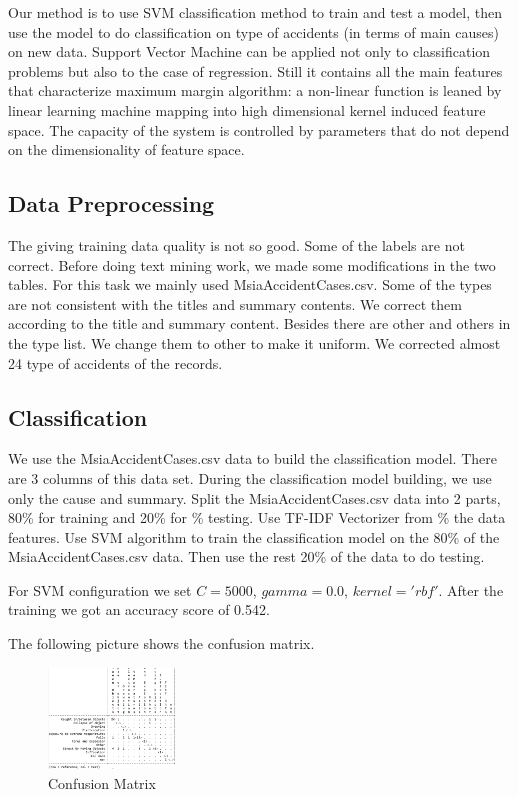 \documentclass[DIV=calc, paper=a4, fontsize=11pt, twocolumn]{scrartcl}	 %
\begin{document}
Our method is to use SVM classification method to train and
test a model, then use the model to do classification on type of
accidents (in terms of main causes) on new data. Support Vector
Machine can be applied not only to classification problems but also to
the case of regression. Still it contains all the main features that
characterize maximum margin algorithm: a non-linear function is leaned
by linear learning machine mapping into high dimensional kernel
induced feature space. The capacity of the system is controlled by
parameters that do not depend on the dimensionality of feature space.




\subsection{Data Preprocessing}
The giving training data quality is not so good. Some of the labels
are not correct. Before doing text mining work, we made some
modifications in the two tables. For this task we mainly used
MsiaAccidentCases.csv. Some of the types are not consistent with the
titles and summary contents. We correct them according to the title
and summary content. Besides there are other and others in the type
list. We change them to other to make it uniform. We corrected almost 24
type of accidents of the records.

\subsection{Classification}
\label{classification}

We use the MsiaAccidentCases.csv data to build the classification
model. There are 3 columns of this data set. During the classification
model building, we use only the cause and summary. Split the
MsiaAccidentCases.csv data into 2 parts, 80\% for training and 20\% for
                                \% testing. Use TF-IDF Vectorizer from
                                \% the data features.
Use SVM algorithm to train the classification model on the 80\% of the MsiaAccidentCases.csv data. Then use the rest 20\% of the data to do testing.


For SVM configuration we set $C = 5000$, $gamma = 0.0$, $kernel =
'rbf'$. After the training we got an accuracy score of 0.542.

The following picture shows the confusion matrix.

\begin{figure}[h!]
  \centering
      \includegraphics[width=0.3\textwidth]{confusion.png}
  \caption{Confusion Matrix}
\end{figure}
\end{document}
